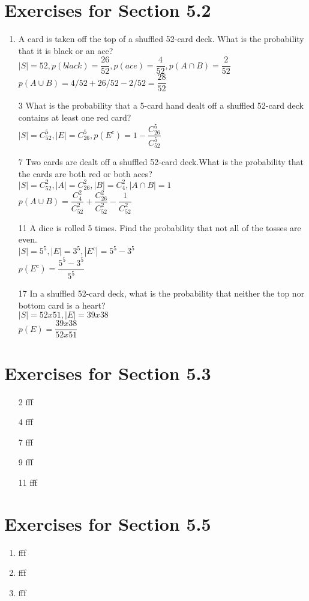 \documentclass[12pt]{article}
\begin{document}
\section*{Exercises for Section 5.2}
\begin{enumerate}
    \item A card is taken off the top of a shuffled 52-card deck. What is the probability that it is black or an ace?\\
	$|S| = 52, p(black) = \dfrac{26}{52}, p(ace)=\dfrac{4}{52}, p(A\cap B) = \dfrac{2}{52}$\\
	$p(A\cup B) =  4/52 + 26/52 - 2/52 = \dfrac{28}{52}$
    \item [3] What is the probability that a 5-card hand dealt off a shuffled 52-card deck contains at least one red card?\\
	$|S| = C_{52}^5, |E| = C_{26}^{5}, p(E^c) = 1 - \dfrac{C_{26}^5}{C_{52}^5}$
    \item [7] Two cards are dealt off a shuffled 52-card deck.What is the probability that the cards are both red or both aces?\\
	$|S| = C_{52}^2, |A|=C_{26}^2, |B|=C_{4}^2, |A\cap B| = 1$\\
	$p(A\cup B) = \dfrac{C_4^2}{C_{52}^2} + \dfrac{C_{26}^2}{C_{52}^2} - \dfrac{1}{C_{52}^2}$
    \item [11] A dice is rolled 5 times. Find the probability that not all of the tosses are even.\\
	$|S| = 5^5, |E| = 3^5, |E^c| = 5^5 - 3^5$\\
	$p(E^c) = \dfrac{5^5-3^5}{5^5}$
    \item [17] In a shuffled 52-card deck, what is the probability that neither the top nor bottom card is a heart?\\
	$|S| = 52x51, |E| = 39x38$\\
	$p(E)= \dfrac{39x38}{52x51}$
\end{enumerate}
\section*{Exercises for Section 5.3}
\begin{enumerate}
    \item [2] fff
    \item [4] fff
    \item [7] fff
    \item [9] fff
    \item [11] fff
\end{enumerate}
\section*{Exercises for Section 5.5}
\begin{enumerate}
    \item fff
    \item fff
    \item fff
\end{enumerate}
\end{document}
